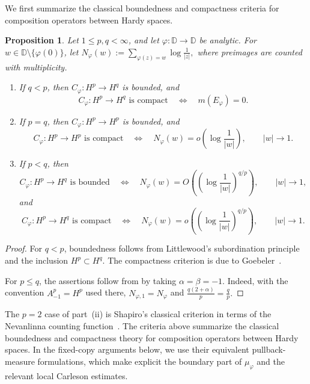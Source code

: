\documentclass[10pt,a4paper]{amsart}
\newtheorem{proposition}[theorem]{Proposition}
\newcommand{\D}{\mathbb{D}}
\begin{document}
We first summarize the classical boundedness and compactness criteria
for composition operators between Hardy spaces.

\begin{proposition}
\label{prop:classical}
Let \(1\le p,q<\infty\), and let \(\varphi:\D\to\D\) be analytic.
For \(w\in\D\setminus\{\varphi(0)\}\), let
\(
        N_\varphi(w)
        :=
        \sum\limits_{\varphi(z)=w}
        \log\frac{1}{|z|},
\)
where preimages are counted with multiplicity.

\begin{enumerate}[label=\textup{(\roman*)}]
\item If \(q<p\), then \(C_\varphi:H^p\to H^q\) is bounded, and
\[
        C_\varphi:H^p\to H^q\text{ is compact}
        \quad\Longleftrightarrow\quad
        m(E_\varphi)=0.
\]

\item If \(p=q\), then \(C_\varphi:H^p\to H^p\) is bounded, and
\[
        C_\varphi:H^p\to H^p\text{ is compact}
        \quad\Longleftrightarrow\quad
        N_\varphi(w)
        =
        o\!\left(\log\frac{1}{|w|}\right),
        \qquad |w|\to1.
\]

\item If \(p<q\), then
\[
        C_\varphi:H^p\to H^q\text{ is bounded}
        \quad\Longleftrightarrow\quad
        N_\varphi(w)
        =
        O\!\left(
        \left(\log\frac{1}{|w|}\right)^{q/p}
        \right),
        \qquad |w|\to1,
\]
and
\[
        C_\varphi:H^p\to H^q\text{ is compact}
        \quad\Longleftrightarrow\quad
        N_\varphi(w)
        =
        o\!\left(
        \left(\log\frac{1}{|w|}\right)^{q/p}
        \right),
        \qquad |w|\to1.
\]
\end{enumerate}
\end{proposition}

\begin{proof}
For \(q<p\), boundedness follows from Littlewood's subordination
principle and the inclusion \(H^p\subset H^q\). The compactness
criterion is due to Goebeler~\cite[Corollary~5, p.~390]{Goebeler2001}.

For \(p\le q\), the assertions follow from
\cite[Theorem~A, p.~311]{PerezGonzalezRattyaVukotic2007} by taking
\(\alpha=\beta=-1\). Indeed, with the convention \(A_{-1}^p=H^p\) used there,
\(N_{\varphi,1}=N_\varphi\) and
\(
\frac{q(2+\alpha)}{p}
=\frac{q}{p}.
\)
\end{proof}
The \(p=2\) case of part~\textup{(ii)} is Shapiro's classical criterion in terms of the Nevanlinna counting
function~\cite{Shapiro1987}.
The criteria above summarize the classical boundedness and compactness
theory for composition operators between Hardy spaces. In the
fixed-copy arguments below, we use their equivalent pullback-measure
formulations, which make explicit the boundary part of
\(\mu_\varphi\) and the relevant local Carleson estimates.
\end{document}
